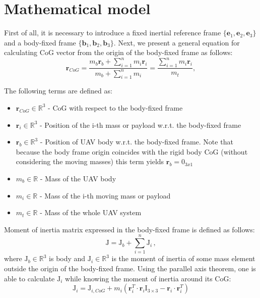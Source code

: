 \section{Mathematical model} \label{sec:model}

First of all, it is necessary to introduce a fixed inertial reference frame $\{  \textbf{e}_1,  \textbf{e}_2,  \textbf{e}_3  \}$ and a body-fixed frame $ \{  \textbf{b}_1,  \textbf{b}_2,  \textbf{b}_3 \}$. Next, we present
a general equation for calculating CoG vector from the origin of the body-fixed frame as follows: 
\begin{equation}
	\textbf{r}_{CoG} = \frac{m_{b}\textbf{r}_{b} + \sum_{i=1}^n m_{i} \textbf{r}_{i}}{m_{b} + \sum_{i=1}^n m_{i}} = \frac{\sum_{i=1}^n m_{i}\textbf{r}_{i}}{m_t},
	\label{equ:cog}
\end{equation}

The following terms are defined as: 
\begin{itemize}
	\item $ \textbf{r}_{CoG} \in \mathbb{\text{R}}^3$ - CoG with respect to the body-fixed frame
	
	\item $ \textbf{r}_{i} \in \mathbb{\text{R}}^3$ - Position of the i-th mass or payload w.r.t. the body-fixed frame
	
	\item $ \textbf{r}_{b} \in \mathbb{\text{R}}^3$ - Position of UAV body w.r.t. the body-fixed frame. Note that because the body frame origin coincides with the rigid body CoG (without considering the moving masses) this term yields $ \textbf{r}_b = 0_{3x1}$
	
	\item $m_b \in \mathbb{R}$ - Mass of the UAV body 
	
	\item $m_i \in \mathbb{R}$ - Mass of the i-th moving mass or payload
	
	\item $m_t \in \mathbb{R}$ - Mass of the whole UAV system
\end{itemize}

Moment of inertia matrix expressed in the body-fixed frame is defined as follows:
\begin{equation}
\text{J} = \text{J}_b + \sum_{i=1}^{n}\text{J}_i \, ,
\end{equation}
where $\text{J}_b \in \mathbb{R}^3$ is body and $\text{J}_i \in \mathbb{R}^3$ is the moment of inertia of some mass element outside the origin of the body-fixed frame. Using the parallel axis theorem, one is able to calculate $\text{J}_i$ while knowing the moment of inertia around its CoG:
\begin{equation}
\text{J}_i = \text{J}_{i,CoG} + m_i( \textbf{r}_i^T \cdot  \textbf{r}_i \text{I}_{3 \times 3} -  \textbf{r}_i \cdot  \textbf{r}_i^T)
\end{equation}

